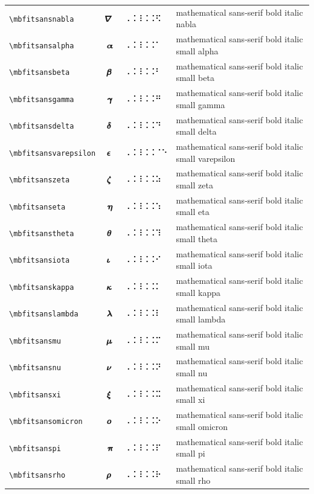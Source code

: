 \documentclass[oneside]{article}
\begin{document}
\begin{longtable}{llll}
\verb|\mbfitsansnabla| & $\mbfitsansnabla$ &  ⠠⠨⠸⠨⠨⠫  & {mathematical sans-serif bold italic nabla} \\[2ex]
\verb|\mbfitsansalpha| & $\mbfitsansalpha$ &  ⠠⠨⠸⠨⠨⠁  & {mathematical sans-serif bold italic small alpha} \\[2ex]
\verb|\mbfitsansbeta| & $\mbfitsansbeta$ &  ⠠⠨⠸⠨⠨⠃  & {mathematical sans-serif bold italic small beta} \\[2ex]
\verb|\mbfitsansgamma| & $\mbfitsansgamma$ &  ⠠⠨⠸⠨⠨⠛  & {mathematical sans-serif bold italic small gamma} \\[2ex]
\verb|\mbfitsansdelta| & $\mbfitsansdelta$ &  ⠠⠨⠸⠨⠨⠙  & {mathematical sans-serif bold italic small delta} \\[2ex]
\verb|\mbfitsansvarepsilon| & $\mbfitsansvarepsilon$ &  ⠠⠨⠸⠨⠨⠈⠑  & {mathematical sans-serif bold italic small varepsilon} \\[2ex]
\verb|\mbfitsanszeta| & $\mbfitsanszeta$ &  ⠠⠨⠸⠨⠨⠵  & {mathematical sans-serif bold italic small zeta} \\[2ex]
\verb|\mbfitsanseta| & $\mbfitsanseta$ &  ⠠⠨⠸⠨⠨⠱  & {mathematical sans-serif bold italic small eta} \\[2ex]
\verb|\mbfitsanstheta| & $\mbfitsanstheta$ &  ⠠⠨⠸⠨⠨⠹  & {mathematical sans-serif bold italic small theta} \\[2ex]
\verb|\mbfitsansiota| & $\mbfitsansiota$ &  ⠠⠨⠸⠨⠨⠊  & {mathematical sans-serif bold italic small iota} \\[2ex]
\verb|\mbfitsanskappa| & $\mbfitsanskappa$ &  ⠠⠨⠸⠨⠨⠅  & {mathematical sans-serif bold italic small kappa} \\[2ex]
\verb|\mbfitsanslambda| & $\mbfitsanslambda$ &  ⠠⠨⠸⠨⠨⠇  & {mathematical sans-serif bold italic small lambda} \\[2ex]
\verb|\mbfitsansmu| & $\mbfitsansmu$ &  ⠠⠨⠸⠨⠨⠍  & {mathematical sans-serif bold italic small mu} \\[2ex]
\verb|\mbfitsansnu| & $\mbfitsansnu$ &  ⠠⠨⠸⠨⠨⠝  & {mathematical sans-serif bold italic small nu} \\[2ex]
\verb|\mbfitsansxi| & $\mbfitsansxi$ &  ⠠⠨⠸⠨⠨⠭  & {mathematical sans-serif bold italic small xi} \\[2ex]
\verb|\mbfitsansomicron| & $\mbfitsansomicron$ &  ⠠⠨⠸⠨⠨⠕  & {mathematical sans-serif bold italic small omicron} \\[2ex]
\verb|\mbfitsanspi| & $\mbfitsanspi$ &  ⠠⠨⠸⠨⠨⠏  & {mathematical sans-serif bold italic small pi} \\[2ex]
\verb|\mbfitsansrho| & $\mbfitsansrho$ &  ⠠⠨⠸⠨⠨⠗  & {mathematical sans-serif bold italic small rho} \\[2ex]

\end{longtable}
\end{document}
